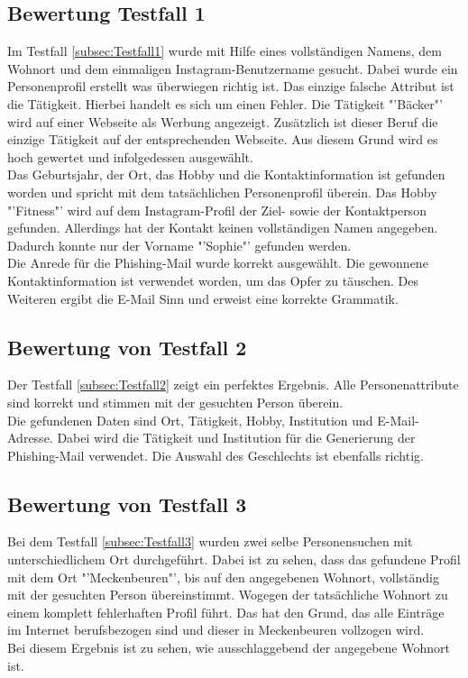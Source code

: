 	\subsection{Bewertung Testfall 1}
	Im Testfall \ref{subsec:Testfall1} wurde mit Hilfe eines vollständigen Namens, dem Wohnort und dem einmaligen Instagram-Benutzername gesucht. Dabei wurde ein Personenprofil erstellt was überwiegen richtig ist. Das einzige falsche Attribut ist die Tätigkeit. Hierbei handelt es sich um einen Fehler. Die Tätigkeit "'Bäcker"' wird auf einer Webseite als Werbung angezeigt. Zusätzlich ist dieser Beruf die einzige Tätigkeit auf der entsprechenden Webseite. Aus diesem Grund wird es hoch gewertet und infolgedessen ausgewählt.\\
	Das Geburtsjahr, der Ort, das Hobby und die Kontaktinformation ist gefunden worden und spricht mit dem tatsächlichen Personenprofil überein. Das Hobby "'Fitness"' wird auf dem Instagram-Profil der Ziel- sowie der Kontaktperson gefunden. Allerdings hat der Kontakt keinen vollständigen Namen angegeben. Dadurch konnte nur der Vorname "'Sophie"' gefunden werden.\\
	Die Anrede für die Phishing-Mail wurde korrekt ausgewählt. Die gewonnene Kontaktinformation ist verwendet worden, um das Opfer zu täuschen. Des Weiteren ergibt die E-Mail Sinn und erweist eine korrekte Grammatik. 
	\subsection{Bewertung von Testfall 2}
	Der Testfall \ref{subsec:Testfall2} zeigt ein perfektes Ergebnis. Alle Personenattribute sind korrekt und stimmen mit der gesuchten Person überein. \\
	Die gefundenen Daten sind Ort, Tätigkeit, Hobby, Institution und E-Mail-Adresse. Dabei wird die Tätigkeit und Institution für die Generierung der Phishing-Mail verwendet. Die Auswahl des Geschlechts ist ebenfalls richtig.
	\subsection{Bewertung von Testfall 3}
	Bei dem Testfall \ref{subsec:Testfall3} wurden zwei selbe Personensuchen mit unterschiedlichem Ort durchgeführt. Dabei ist zu sehen, dass das gefundene Profil mit dem Ort "'Meckenbeuren"', bis auf den angegebenen Wohnort, vollständig mit der gesuchten Person übereinstimmt. Wogegen der tatsächliche Wohnort zu einem komplett fehlerhaften Profil führt. Das hat den Grund, das alle Einträge im Internet berufsbezogen sind und dieser in Meckenbeuren vollzogen wird.\\
	Bei diesem Ergebnis ist zu sehen, wie ausschlaggebend der angegebene Wohnort ist.
